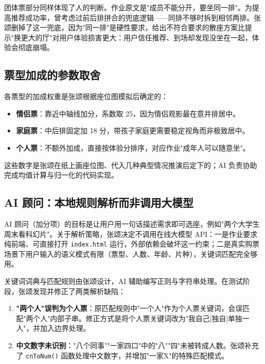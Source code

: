 \documentclass[12pt,a4paper]{ctexart}
\begin{document}
团体票部分同样体现了人的判断。作业原文是"成员不能分开，要坐同一排"。为提高推荐成功率，曾考虑过前后排拼合的兜底逻辑——同排不够时拆到相邻两排。张颂删掉了这一兜底，因为"同一排"是硬性要求，给出不符合要求的散座方案比提示"换更大的厅"对用户体验损害更大：用户信任推荐、到场却发现没坐在一起，体验会彻底崩塌。

\subsection{票型加成的参数取舍}

各票型的加成权重是张颂根据座位图模拟后确定的：

\begin{itemize}
  \item \textbf{情侣票}：靠近中轴线加分，系数取 25，因为情侣观影最在意并排居中。
  \item \textbf{家庭票}：中后排固定加 18 分，带孩子家庭更需要稳定视角而非极致居中。
  \item \textbf{个人票}：不额外加成，直接按体验分排序，对应作业"成年人可以随意坐"。
\end{itemize}

这些数字是张颂在纸上画座位图、代入几种典型情况推演后定下的；AI 负责协助完成均值计算与归一化的代码实现。

\subsection{AI 顾问：本地规则解析而非调用大模型}

AI 顾问（加分项）的目标是让用户用一句话描述需求即可选座，例如"两个大学生周末看科幻片"。关于解析策略，张颂决定不调用在线大模型 API：一是作业要求纯前端、可直接打开 \texttt{index.html} 运行，外部依赖会破坏这一约束；二是真实购票场景下用户输入的语义模式有限（票型、人数、年龄、片种），关键词匹配完全够用。

关键词词典与匹配规则由张颂设计，AI 辅助编写正则与字符串处理。在测试阶段，张颂发现并修正了两类解析缺陷：

\begin{enumerate}
  \item \textbf{"两个人"误判为个人票}：原匹配规则中"一个人"作为个人票关键词，会误匹配"两个人"内部子串。修正方式是将个人票关键词改为"我自己|独自|单独一人"，并加入边界处理。
  \item \textbf{中文数字未识别}："八个同事""一家四口"中的"八""四"未被转成人数。张颂补充了 \texttt{cnToNum()} 函数处理中文数字，并增加"一家X"的特殊匹配模式。
\end{enumerate}
\end{document}
